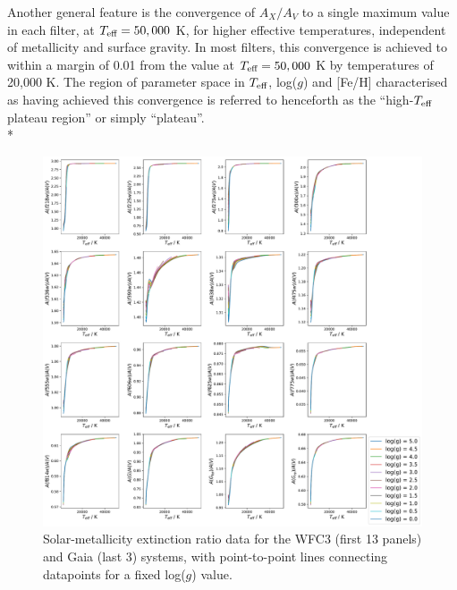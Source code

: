 \documentclass[12pt, a4paper]{report}
\begin{document}
Another general feature is the convergence of $A_{X}/A_{V}$ to a single maximum value in each filter, at $T_{\textnormal{eff}} = 50,000$ K, for higher effective temperatures, independent of metallicity and surface gravity. In most filters, this convergence is achieved to within a margin of 0.01 from the value at $T_{\textnormal{eff}} = 50,000$ K by temperatures of 20,000 K. The region of parameter space in $T_{\textnormal{eff}}$, log($g$) and [Fe/H] characterised as having achieved this convergence is referred to henceforth as the ``high-$T_{\textnormal{eff}}$ plateau region'' or simply ``plateau''.\\*

\begin{figure}[hbtp]
\begin{center}
\includegraphics[width=0.85\paperwidth]{../just_full_data/comb/AHub_FeH0p0_just_Teff_plot_lines.pdf}
\caption{Solar-metallicity extinction ratio data for the WFC3 (first 13 panels) and Gaia (last 3) systems, with point-to-point lines connecting datapoints for a fixed log($g$) value.}
\label{just_data_FeH0_WFC3gaia}
\end{center}
\end{figure}
\end{document}
